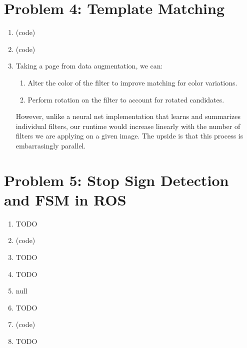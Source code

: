 \documentclass{article}
\begin{document}
\section*{Problem 4: Template Matching}
\begin{enumerate}[label=(\roman*)]
\item %
(code)

\item %
(code)

\item %
Taking a page from data augmentation, we can:

\begin{enumerate}
\item Alter the color of the filter to improve matching for color variations.
\item Perform rotation on the filter to account for rotated candidates.
\end{enumerate}

However, unlike a neural net implementation that learns and summarizes individual filters, our runtime would increase linearly with the number of filters we are applying on a given image. The upside is that this process is embarrasingly parallel.
	
\end{enumerate}


\section*{Problem 5: Stop Sign Detection and FSM in ROS}
\begin{enumerate}[label=(\roman*)]
\item %
TODO

\item %
(code)

\item %
TODO

\item %
TODO

\item %
null

\item %
TODO

\item %
(code)

\item %
TODO
	
\end{enumerate}
\end{document}
